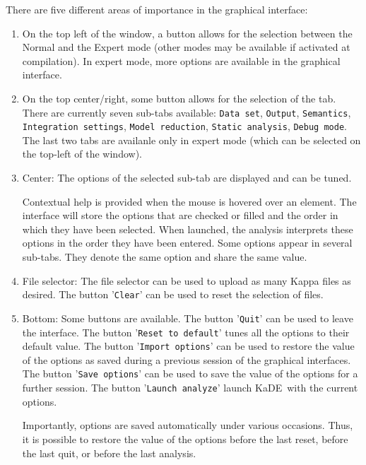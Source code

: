 \documentclass[11pt]{book}
\def\KaDE{\textsf{KaDE}}
\begin{document}
There are five different areas of importance in the graphical interface:
\begin{enumerate}
\item On the top left of the window, a button allows for the selection between the Normal and the Expert mode (other modes may be available if activated at compilation).
In expert mode, more options are available in the graphical interface.
\item On the top center/right, some button allows for the selection of the tab. There are currently seven sub-tabs available: \texttt{Data set}, \texttt{Output}, \texttt{Semantics}, \texttt{Integration settings}, \texttt{Model reduction}, \texttt{Static analysis}, \texttt{Debug mode}. The last two tabs are availanle only in expert mode (which can be selected on the top-left of the window).

\item Center: The options of the selected sub-tab are displayed and can be tuned.

Contextual help is provided when the mouse is hovered over an element.
The interface will store the options that are checked or filled and the order in which they have been selected.
When launched, the analysis interprets these options in the order they have been entered.
Some options appear in several sub-tabs. They denote the same option and share the same value.

\item File selector: The file selector can be used to upload as many Kappa files as desired. The button '\texttt{Clear}' can be used to reset the selection of files.
\item Bottom: Some buttons are available. The button '\texttt{Quit}' can be used to leave the interface. The button '\texttt{Reset to default}' tunes all the options to their default value. The button '\texttt{Import options}' can be used to restore the value of the options as saved during a previous session of the graphical interfaces. The button '\texttt{Save options}' can be used to save the value of the options for a further session. The button '\texttt{Launch analyze}' launch \KaDE\ with the current options.

Importantly, options are saved automatically under various occasions. Thus, it is possible to restore the value of the options
before the last reset, before the last quit, or before the last analysis.
\end{enumerate}
\end{document}
